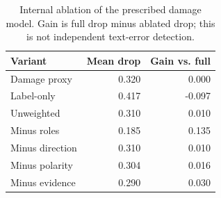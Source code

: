 \begin{table}[t]
\centering
\small
\caption{Internal ablation of the prescribed damage model. Gain is full drop minus ablated drop; this is not independent text-error detection.}
\label{tab:ablation-gain}
\begin{tabular}{lrr}
\toprule
Variant & Mean drop & Gain vs. full \\
\midrule
Damage proxy & 0.320 & 0.000 \\
Label-only & 0.417 & -0.097 \\
Unweighted & 0.310 & 0.010 \\
Minus roles & 0.185 & 0.135 \\
Minus direction & 0.310 & 0.010 \\
Minus polarity & 0.304 & 0.016 \\
Minus evidence & 0.290 & 0.030 \\
\bottomrule
\end{tabular}
\end{table}
